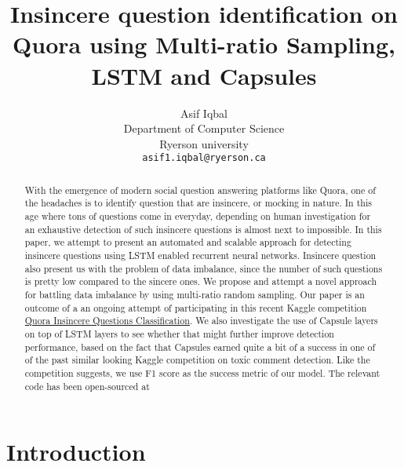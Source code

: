 \documentclass[11pt,twocolumn,letterpaper]{article}
\newcommand{\MYhref}[3][blue]{\href{#2}{\color{#1}{#3}}}%
\begin{document}
\title{Insincere question identification on Quora using Multi-ratio Sampling, LSTM and Capsules}

\author{Asif Iqbal\\
Department of Computer Science\\
Ryerson university\\
{\tt\small asif1.iqbal@ryerson.ca}
}
\maketitle

\begin{abstract}
   With the emergence of modern social question answering platforms like Quora, one of the headaches is to identify question that are insincere, or mocking in nature. In this age where tons of questions come in everyday, depending on human investigation for an exhaustive detection of such insincere questions is almost next to impossible. In this paper, we attempt to present an automated and scalable approach for detecting insincere questions using LSTM enabled recurrent neural networks. Insincere question also present us with the problem of data imbalance, since the number of such questions is pretty low compared to the sincere ones. We propose and attempt a novel approach for battling data imbalance by using multi-ratio random sampling. Our paper is an outcome of a an ongoing attempt of participating in this recent Kaggle competition \href{https://www.kaggle.com/c/quora-insincere-questions-classification}{Quora Insincere Questions Classification}.  We also investigate the use of Capsule layers on top of LSTM layers to see whether that might further improve detection performance, based on the fact that Capsules earned quite a bit of a success in one of of the past similar looking Kaggle competition on toxic comment detection. Like the competition suggests, we use F1 score as the success metric of our model. The relevant code has been open-sourced at \MYhref{https://github.com/asif31iqbal/quora-insincere-identification}{https://github.com/asif31iqbal/quora-insincere-identification}
\end{abstract}

\section{Introduction}
\end{document}

